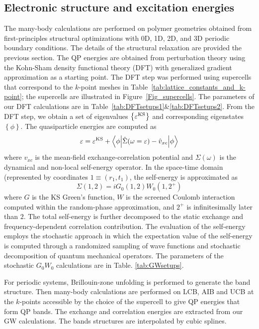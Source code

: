 \documentclass[journal = jpclcd]{achemso}
\begin{document}
\subsection{Electronic structure and excitation energies}
The many-body calculations are performed on polymer geometries obtained from first-principles structural optimizations with 0D, 1D, 2D, and 3D periodic boundary conditions.\cite{Rozzi2006} The details of the structural relaxation are provided the previous section. The QP energies are obtained from perturbation theory using the Kohn-Sham density functional theory (DFT) with generalized gradient approximation as a starting point. The DFT step was performed using supercells that correspond to the $k$-point meshes in Table~\ref{tab:lattice_constants_and_k-point}; the supercells are illustrated in Figure~\ref{Fig_supercells}. The parameters of our DFT calculations are in Table~\ref{tab:DFTsetups1}\&\ref{tab:DFTsetups2}.
From the DFT step, we obtain a set of eigenvalues $\left\{\varepsilon^{\rm KS}\right\}$ and corresponding eigenstates $\left\{\phi\right\}$. The quasiparticle energies are computed as
\begin{equation}
    \varepsilon = \varepsilon^{\rm KS} + \left\langle \phi\middle| \hat \Sigma(\omega = \varepsilon) - \hat v_{xc} \middle| \phi\right\rangle
\end{equation}
where $v_{xc}$ is the mean-field exchange-correlation potential and $\Sigma(\omega)$ is the dynamical and non-local self-energy operator. In the space-time domain (represented by coordinates $1\equiv (r_1, t_1)$, the self-energy is approximated as \cite{Hedin1965}
\begin{equation}
    \Sigma(1,2) = iG_0(1,2)W_0(1,2^+)
\end{equation}
where $G$ is the KS Green's function, $W$ is the screened Coulomb interaction computed within the random-phase approximation, and $2^+$ is infinitesimally later than $2$.\cite{martin_reining_ceperley_2016} The total self-energy is further decomposed to the static exchange and frequency-dependent correlation contribution. The evaluation of the self-energy employs the stochastic approach in which the expectation value of the self-energy is computed through a randomized sampling of wave functions and stochastic decomposition of quantum mechanical operators.\cite{Neuhauser2014,Vlcek2018,Vlcek2019} The parameters of the stochastic $G_0W_0$ calculations are in Table. \ref{tab:GWsetups}.

For periodic systems, Brillouin-zone unfolding \cite{Popescu2012,Huang2014,Boykin2005,Boykin2007,Brooks2020} is performed to generate the band structure. Then many-body calculations are performed on LCB, AIB and UCB at the $k$-points accessible by the choice of the supercell to give QP energies that form QP bands. The exchange and correlation energies are extracted from our GW calculations. The bands structures are interpolated by cubic splines.
\end{document}
